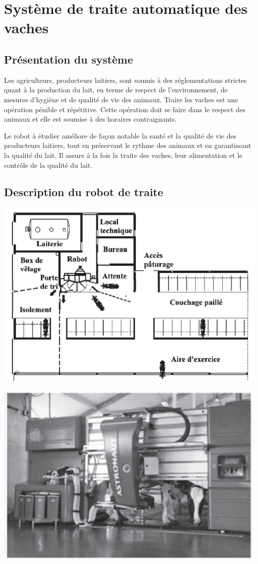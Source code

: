 \section{Système de traite automatique des vaches}

\subsection{Présentation du système}

Les agriculteurs, producteurs laitiers, sont soumis à des réglementations strictes quant à la production du lait, en terme de respect de l'environnement, de mesures d'hygiène et de qualité de vie des animaux. Traire les vaches est une opération pénible et répétitive. Cette opération doit se faire dans le respect des animaux et elle est soumise à des horaires contraignants.

Le robot à étudier améliore de façon notable la santé et la qualité de vie des producteurs laitiers, tout en préservant le rythme des animaux et en garantissant la qualité du lait. Il assure à la fois la traite des vaches, leur alimentation et le contrôle de la qualité du lait.

\subsection{Description du robot de traite}

\begin{minipage}{0.48\linewidth}
 \centering \includegraphics[width=0.75\linewidth]{img/img01v}
\end{minipage}\hfill
\begin{minipage}{0.48\linewidth}
 \centering \includegraphics[width=0.75\linewidth]{img/img02v}
\end{minipage}

